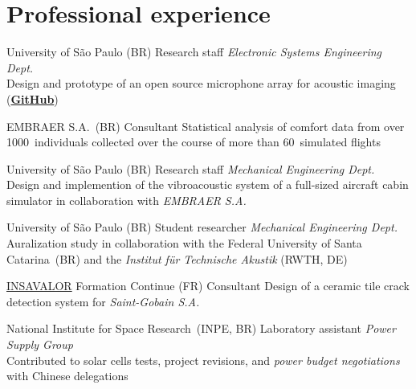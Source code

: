 \documentclass{cvlfoc}
\begin{document}
\vspace{5mm}


\section*{Professional experience}

\begin{entrydate}
		{University of S\~{a}o Paulo (BR)}
		{Research staff}
		{\textit{Electronic Systems Engineering Dept.}
		\\
		Design and prototype of an open source microphone array for acoustic
		imaging\\(\href{https://github.com/lfochamon/memsarray}{\textbf{GitHub}})}

		{EMBRAER S.A.\ (BR)}
		{Consultant}
		{Statistical analysis of comfort data from over 1000~individuals
		collected over the course of more than 60~simulated flights}

		{University of S\~{a}o Paulo (BR)}
		{Research staff}
		{\textit{Mechanical Engineering Dept.}
		\\
		Design and implemention of the vibroacoustic system of
		a full-sized aircraft cabin simulator in collaboration with \emph{EMBRAER S.A.}}

		{University of S\~{a}o Paulo (BR)}
		{Student researcher}
		{\textit{Mechanical Engineering Dept.}
		\\
		Auralization study in collaboration with the Federal University of Santa Catarina~(BR) and the \textit{Institut für Technische Akustik}
		(RWTH, DE)}

		{\href{https://www.insavalor.fr}{INSAVALOR} Formation Continue (FR)}
		{Consultant}
		{Design of a ceramic tile crack detection system for \emph{Saint-Gobain S.A.}}

		{National Institute for Space Research~(INPE, BR)}
		{Laboratory assistant}
		{\textit{Power Supply Group}
		\\
		Contributed to solar cells tests, project revisions, and
		\emph{power budget negotiations} with Chinese delegations}
\end{entrydate}
\end{document}

